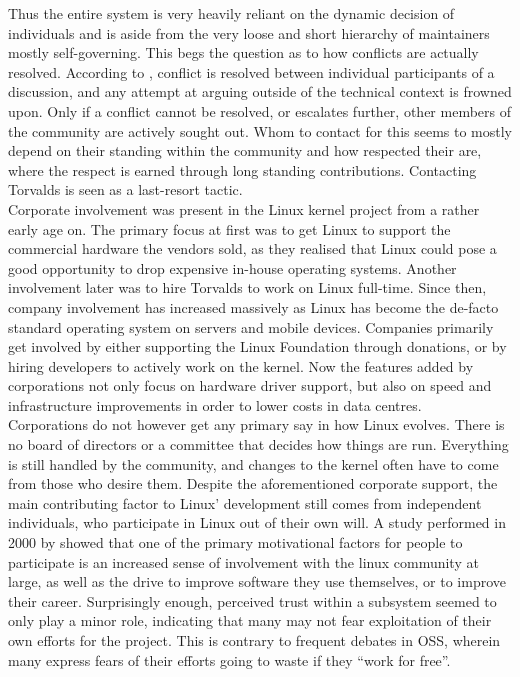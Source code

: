 Thus the entire system is very heavily reliant on the dynamic decision of individuals and is aside from the very loose and short hierarchy of maintainers mostly self-governing. This begs the question as to how conflicts are actually resolved. According to \citet{linux-participation}, conflict is resolved between individual participants of a discussion, and any attempt at arguing outside of the technical context is frowned upon. Only if a conflict cannot be resolved, or escalates further, other members of the community are actively sought out. Whom to contact for this seems to mostly depend on their standing within the community and how respected their are, where the respect is earned through long standing contributions. Contacting Torvalds is seen as a last-resort tactic. \\

Corporate involvement was present in the Linux kernel project from a rather early age on\cite{linus-biography}. The primary focus at first was to get Linux to support the commercial hardware the vendors sold, as they realised that Linux could pose a good opportunity to drop expensive in-house operating systems. Another involvement later was to hire Torvalds to work on Linux full-time. Since then, company involvement has increased massively as Linux has become the de-facto standard operating system on servers\cite{linux-server} and mobile devices\cite{linux-usage}. Companies primarily get involved by either supporting the Linux Foundation through donations\cite{linux-foundation}, or by hiring developers to actively work on the kernel\cite{linux-whowrites}. Now the features added by corporations not only focus on hardware driver support, but also on speed and infrastructure improvements in order to lower costs in data centres\cite{linux-bbr}. \\

Corporations do not however get any primary say in how Linux evolves. There is no board of directors or a committee that decides how things are run. Everything is still handled by the community, and changes to the kernel often have to come from those who desire them. Despite the aforementioned corporate support, the main contributing factor to Linux' development still comes from independent individuals, who participate in Linux out of their own will. A study performed in 2000 by \citet{linux-motivation} showed that one of the primary motivational factors for people to participate is an increased sense of involvement with the linux community at large, as well as the drive to improve software they use themselves, or to improve their career. Surprisingly enough, perceived trust within a subsystem seemed to only play a minor role, indicating that many may not fear exploitation of their own efforts for the project. This is contrary to frequent debates in OSS, wherein many express fears of their efforts going to waste if they ``work for free''. \\

